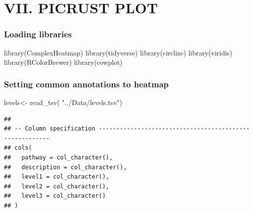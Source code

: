 \documentclass[]{interact}
\theoremstyle{plain}%
\theoremstyle{definition}
\theoremstyle{remark}
\newenvironment{Shaded}{\begin{snugshade}}{\end{snugshade}}
\newcommand{\FunctionTok}[1]{\textcolor[rgb]{0.00,0.00,0.00}{#1}}
\newcommand{\NormalTok}[1]{#1}
\newcommand{\OtherTok}[1]{\textcolor[rgb]{0.56,0.35,0.01}{#1}}
\newcommand{\StringTok}[1]{\textcolor[rgb]{0.31,0.60,0.02}{#1}}
\begin{document}
\hypertarget{vii.-picrust-plot}{%
\section{VII. PICRUST PLOT}\label{vii.-picrust-plot}}

\hypertarget{loading-libraries-5}{%
\subsubsection{Loading libraries}\label{loading-libraries-5}}

\begin{Shaded}
\begin{Highlighting}[]
\FunctionTok{library}\NormalTok{(ComplexHeatmap)}
\FunctionTok{library}\NormalTok{(tidyverse)}
\FunctionTok{library}\NormalTok{(circlize)}
\FunctionTok{library}\NormalTok{(viridis)}
\FunctionTok{library}\NormalTok{(RColorBrewer)}
\FunctionTok{library}\NormalTok{(cowplot)}
\end{Highlighting}
\end{Shaded}

\hypertarget{setting-common-annotations-to-heatmap}{%
\subsubsection{Setting common annotations to
heatmap}\label{setting-common-annotations-to-heatmap}}

\begin{Shaded}
\begin{Highlighting}[]
\NormalTok{levels}\OtherTok{\textless{}{-}} \FunctionTok{read\_tsv}\NormalTok{( }\StringTok{"../Data/levels.tsv"}\NormalTok{)}
\end{Highlighting}
\end{Shaded}

\begin{verbatim}
## 
## -- Column specification --------------------------------------------------------
## cols(
##   pathway = col_character(),
##   description = col_character(),
##   level1 = col_character(),
##   level2 = col_character(),
##   level3 = col_character()
## )
\end{verbatim}
\end{document}
